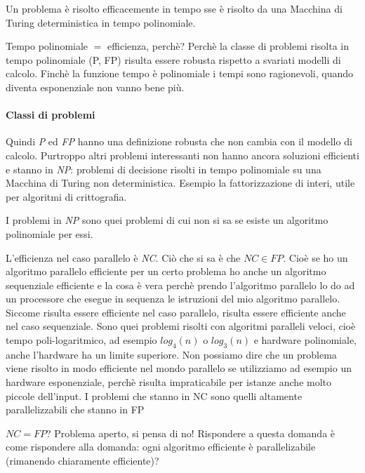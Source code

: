 Un problema è risolto efficacemente in tempo sse è risolto da una Macchina di Turing deterministica in tempo polinomiale.

Tempo polinomiale $=$ efficienza, perchè? Perchè la classe di problemi risolta in tempo polinomiale (P, FP) risulta essere robusta rispetto a svariati modelli di calcolo. Finchè la funzione tempo è polinomiale i tempi sono ragionevoli, quando diventa esponenziale non vanno bene più.

\paragraph{Classi di problemi}
Quindi \textit{P} ed \textit{FP} hanno una definizione robusta che non cambia con il modello di calcolo. Purtroppo altri problemi interessanti non hanno ancora soluzioni efficienti e stanno in \textit{NP}: problemi di decisione risolti in tempo polinomiale su una Macchina di Turing non deterministica. Esempio la fattorizzazione di interi, utile per algoritmi di crittografia. 

I problemi in \textit{NP} sono quei problemi di cui non si sa se esiste un algoritmo polinomiale per essi.

L'efficienza nel caso parallelo è \textit{NC}. Ciò che si sa è che $NC \in FP$. Cioè se ho un algoritmo parallelo efficiente per un certo problema ho anche un algoritmo sequenziale efficiente e la cosa è vera perchè prendo l'algoritmo parallelo lo do ad un processore che esegue in sequenza le istruzioni del mio algoritmo parallelo. Siccome risulta essere efficiente nel caso parallelo, risulta essere efficiente anche nel caso sequenziale. Sono quei problemi risolti con algoritmi paralleli veloci, cioè tempo poli-logaritmico, ad esempio $log_4(n)$ o $log_3(n)$ e hardware polinomiale, anche l'hardware ha un limite superiore. Non possiamo dire che un problema viene risolto in modo efficiente nel mondo parallelo se utilizziamo ad esempio un hardware esponenziale, perchè risulta impraticabile per istanze anche molto piccole dell'input. I problemi che stanno in NC sono quelli altamente parallelizzabili che stanno in FP

$NC = FP$? Problema aperto, si pensa di no! Rispondere a questa domanda è come rispondere alla domanda: ogni algoritmo efficiente è parallelizabile (rimanendo chiaramente efficiente)?


